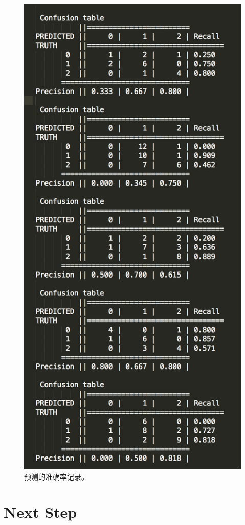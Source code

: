 \documentclass[10pt,a4paper]{article}
\begin{document}
\begin{figure}[t]
	\centering
	\includegraphics[width=0.9\linewidth]{result}
	\caption{预测的准确率记录。}
	\label{fig0}
\end{figure} 

\section{Next Step}
\end{document}

